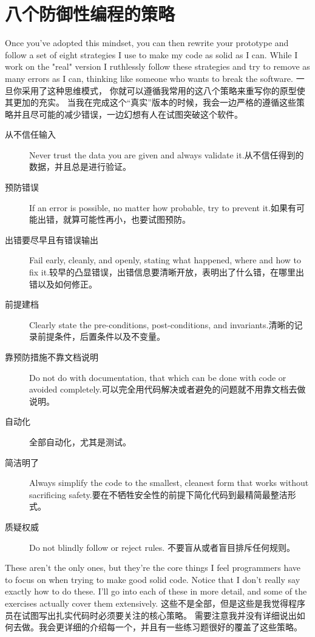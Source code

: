 \section{八个防御性编程的策略}

Once you've adopted this mindset, you can then rewrite your prototype and follow
a set of eight strategies I use to make my code as solid as I can.  While I work
on the "real" version I ruthlessly follow these strategies and try to remove
as many errors as I can, thinking like someone who wants to break the software.
一旦你采用了这种思维模式， 你就可以遵循我常用的这八个策略来重写你的原型使其更加的充实。
当我在完成这个“真实”版本的时候，我会一边严格的遵循这些策略并且尽可能的减少错误，一边幻想有人在试图突破这个软件。


\begin{description}
\item[从不信任输入] Never trust the data you are given and always validate it.从不信任得到的数据，并且总是进行验证。
\item[预防错误] If an error is possible, no matter how probable, try to prevent it.如果有可能出错，就算可能性再小，也要试图预防。
\item[出错要尽早且有错误输出] Fail early, cleanly, and openly, stating what happened, where and how to fix it.较早的凸显错误，出错信息要清晰开放，表明出了什么错，在哪里出错以及如何修正。
\item[前提建档] Clearly state the pre-conditions, post-conditions, and invariants.清晰的记录前提条件，后置条件以及不变量。
\item[靠预防措施不靠文档说明] Do not do with documentation, that which can be done with code or avoided completely.可以完全用代码解决或者避免的问题就不用靠文档去做说明。
\item[自动化] 全部自动化，尤其是测试。 
\item[简洁明了] Always simplify the code to the smallest, cleanest form that works without sacrificing safety.要在不牺牲安全性的前提下简化代码到最精简最整洁形式。
\item[质疑权威] Do not blindly follow or reject rules. 不要盲从或者盲目排斥任何规则。
\end{description}

These aren't the only ones, but they're the core things I feel programmers have
to focus on when trying to make good solid code.  Notice that I don't really
say exactly how to do these.  I'll go into each of these in more detail, and
some of the exercises actually cover them extensively.
这些不是全部，但是这些是我觉得程序员在试图写出扎实代码时必须要关注的核心策略。
需要注意我并没有详细说出如何去做。我会更详细的介绍每一个，并且有一些练习题很好的覆盖了这些策略。

